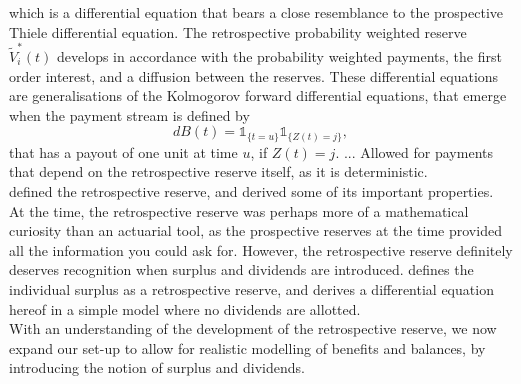\documentclass[12pt]{article}
\newcommand{\indic}[1]{\mathds{1}_{ \{ #1 \} }}
\theoremstyle{my_thm}
\begin{document}
which is a differential equation that bears a close resemblance to the prospective Thiele differential equation. The retrospective probability weighted reserve $\tilde{V}_i^*(t)$ develops in accordance with the probability weighted payments, the first order interest, and a diffusion between the reserves. These differential equations are generalisations of the Kolmogorov forward differential equations, that emerge when the payment stream is defined by
$$
dB(t)=\indic{t=u}\indic{Z(t)=j},
$$
that has a payout of one unit at time $u$, if $Z(t)=j$. ... Allowed for payments that depend on the retrospective reserve itself, as it is deterministic.
\\
\citet{Norberg} defined the retrospective reserve, and derived some of its important properties. At the time, the retrospective reserve was perhaps more of a mathematical curiosity than an actuarial tool, as the prospective reserves at the time provided all the information you could ask for. However, the retrospective reserve definitely deserves recognition when surplus and dividends are introduced. \citet{NorbergB} defines the individual surplus as a retrospective reserve, and derives a differential equation hereof in a simple model where no dividends are allotted.
\\
With an understanding of the development of the retrospective reserve, we now expand our set-up to allow for realistic modelling of benefits and balances, by introducing the notion of surplus and dividends.
\end{document}

